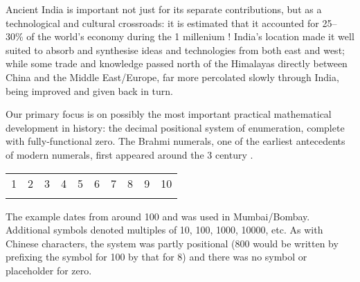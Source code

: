 Ancient India is important not just for its separate contributions, but as a technological and cultural crossroads: it is estimated that it accounted for 25--30\% of the world's economy during the 1\st{} millenium \!\AD{}! India's location made it well suited to absorb and synthesise ideas and technologies from both east and west; while some trade and knowledge passed north of the Himalayas directly between China and the Middle East/Europe, far more percolated slowly through India, being improved and given back in turn.


% 
% 
% 
% 
% 


Our primary focus is on possibly the most important practical mathematical development in history: the decimal positional system of enumeration, complete with fully-functional zero. The Brahmi numerals, one of the earliest antecedents of modern numerals, first appeared around the 3\rd{} century \BC{}.
\begin{center}
	\begin{tabular}{cccccccccc}
		1&2&3&4&5&6&7&8&9&10\\
		\IndiaBone&\IndiaBtwo&\IndiaBthree&\IndiaBfour&\IndiaBfive&\IndiaBsix&\IndiaBseven&\IndiaBeight&\IndiaBnine&\IndiaBten
	\end{tabular}
\end{center}
The example dates from around 100\BC{} and was used in Mumbai/Bombay. Additional symbols denoted multiples of 10, 100, 1000, 10000, etc. As with Chinese characters, the system was partly positional (800 would be written by prefixing the symbol for 100 by that for 8) and there was no symbol or placeholder for zero.
\goodbreak

